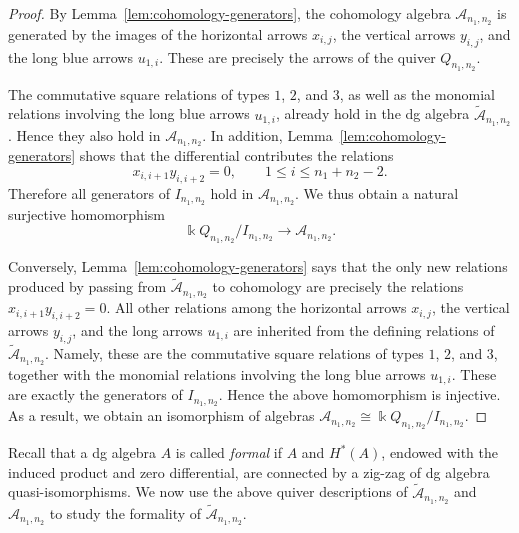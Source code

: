 \documentclass[a4paper, reqno, 11pt]{amsart}
\theoremstyle{definition}
\begin{document}
\begin{proof}
	By Lemma~\ref{lem:cohomology-generators}, the cohomology algebra
	\(\mathcal{A}_{n_1,n_2}\) is generated by the images of the horizontal arrows
	\(x_{i,j}\), the vertical arrows \(y_{i,j}\), and the long blue arrows
	\(u_{1,i}\).  These are precisely the arrows of the quiver
	\(Q_{n_1,n_2}\).
	
	The commutative square relations of types \(1\), \(2\), and \(3\), as well as
	the monomial relations involving the long blue arrows \(u_{1,i}\), already hold in
	the dg algebra \(\widetilde{\mathcal A}_{n_1,n_2}\).  Hence they also hold in
	\(\mathcal{A}_{n_1,n_2}\).  In addition, Lemma~\ref{lem:cohomology-generators}
	shows that the differential contributes the relations
	\[
	x_{i,i+1}y_{i,i+2}=0,
	\qquad
	1\leq i\leq n_1+n_2-2.
	\]
	Therefore all generators of \(I_{n_1,n_2}\) hold in
	\(\mathcal{A}_{n_1,n_2}\).  We thus obtain a natural surjective homomorphism
	\[
	\Bbbk Q_{n_1,n_2}/I_{n_1,n_2}
	\longrightarrow
	\mathcal{A}_{n_1,n_2}.
	\]
	
	Conversely, Lemma~\ref{lem:cohomology-generators} says that the only new
	relations produced by passing from
	\(\widetilde{\mathcal A}_{n_1,n_2}\) to cohomology are precisely the relations \(x_{i,i+1}y_{i,i+2}=0.\) All other relations among the horizontal arrows \(x_{i,j}\), the vertical
	arrows \(y_{i,j}\), and the long arrows \(u_{1,i}\) are inherited from the
	defining relations of \(\widetilde{\mathcal A}_{n_1,n_2}\).  Namely, these are
	the commutative square relations of types \(1\), \(2\), and \(3\), together
	with the monomial relations involving the long blue arrows \(u_{1,i}\).  These are
	exactly the generators of \(I_{n_1,n_2}\).  Hence the above homomorphism is
	injective. As a result, we obtain an isomorphism of algebras $\mathcal{A}_{n_1,n_2}\cong \Bbbk Q_{n_1,n_2}/I_{n_1,n_2}.$
\end{proof}

Recall that a dg algebra \(A\) is called \textit{formal} if \(A\) and \(H^\ast(A)\), endowed with the induced product and zero differential, are connected by a zig-zag of dg algebra quasi-isomorphisms. We now use the above quiver descriptions of \(\widetilde{\mathcal A}_{n_1,n_2}\) and \(\mathcal A_{n_1,n_2}\) to study the formality of \(\widetilde{\mathcal A}_{n_1,n_2}\).
\end{document}
